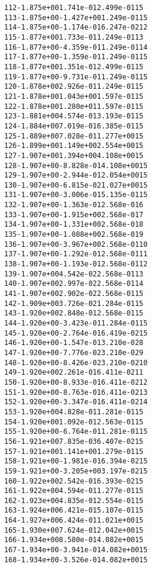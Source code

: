 \begin{alltt}
 112  -1.875e+00   1.741e-01   2.499e-01   15
 113  -1.875e+00  -1.427e+00   1.249e-01   15
 114  -1.875e+00  -1.174e-01   6.247e-02   12
 115  -1.877e+00   1.733e-01   1.249e-01   13
 116  -1.877e+00  -4.359e-01   1.249e-01   14
 117  -1.877e+00  -1.359e-01   1.249e-01   15
 118  -1.877e+00   1.351e-01   2.499e-01   15
 119  -1.877e+00  -9.731e-01   1.249e-01   15
 120  -1.878e+00   2.926e-01   1.249e-01   15
 121  -1.878e+00   1.043e+00   1.597e-01   15
 122  -1.878e+00   1.280e+01   1.597e-01   15
 123  -1.881e+00   4.574e-01   3.193e-01   15
 124  -1.884e+00   7.019e-01   6.385e-01   15
 125  -1.889e+00   7.028e-01   1.277e+00   15
 126  -1.899e+00   1.149e+00   2.554e+00   15
 127  -1.907e+00   1.394e+00   4.108e+00   15
 128  -1.907e+00  -8.828e-01   4.108e+00   15
 129  -1.907e+00  -2.944e-01   2.054e+00   15
 130  -1.907e+00  -6.815e-02   1.027e+00   15
 131  -1.907e+00  -3.006e-01   5.135e-01   15
 132  -1.907e+00  -1.363e-01   2.568e-01    6
 133  -1.907e+00  -1.915e+00   2.568e-01    7
 134  -1.907e+00  -1.331e+00   2.568e-01    8
 135  -1.907e+00  -1.088e+00   2.568e-01    9
 136  -1.907e+00  -3.967e+00   2.568e-01   10
 137  -1.907e+00  -1.292e-01   2.568e-01   11
 138  -1.907e+00  -1.193e-01   2.568e-01   12
 139  -1.907e+00   4.542e-02   2.568e-01   13
 140  -1.907e+00   2.997e-02   2.568e-01   14
 141  -1.907e+00   2.902e-02   2.568e-01   15
 142  -1.909e+00   3.726e-02   1.284e-01   15
 143  -1.920e+00   2.848e-01   2.568e-01   15
 144  -1.920e+00  -3.423e-01   1.284e-01   15
 145  -1.920e+00  -2.764e-01   6.419e-02   15
 146  -1.920e+00  -1.547e-01   3.210e-02    8
 147  -1.920e+00  -7.776e-02   3.210e-02    9
 148  -1.920e+00  -8.426e-02   3.210e-02   10
 149  -1.920e+00   2.261e-01   6.411e-02   11
 150  -1.920e+00  -8.933e-01   6.411e-02   12
 151  -1.920e+00  -8.763e-01   6.411e-02   13
 152  -1.920e+00  -3.347e-01   6.411e-02   14
 153  -1.920e+00   4.828e-01   1.281e-01   15
 154  -1.920e+00   1.092e-01   2.563e-01   15
 155  -1.920e+00  -6.764e-01   1.281e-01   15
 156  -1.921e+00   7.835e-03   6.407e-02   15
 157  -1.921e+00   1.141e+00   1.279e-01   15
 158  -1.921e+00  -1.981e-01   6.394e-02   15
 159  -1.921e+00  -3.205e+00   3.197e-02   15
 160  -1.922e+00   2.542e-01   6.393e-02   15
 161  -1.922e+00   4.594e-01   1.277e-01   15
 162  -1.923e+00   4.835e-01   2.554e-01   15
 163  -1.924e+00   6.421e-01   5.107e-01   15
 164  -1.927e+00   6.424e-01   1.021e+00   15
 165  -1.930e+00   7.624e-01   2.042e+00   15
 166  -1.934e+00   8.580e-01   4.082e+00   15
 167  -1.934e+00  -3.941e-01   4.082e+00   15
 168  -1.934e+00  -3.526e-01   4.082e+00   15

\end{alltt}
